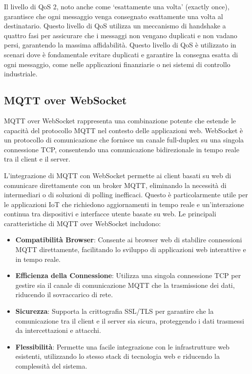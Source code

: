 \documentclass[12pt,a4paper,openright,twoside]{book}
\begin{document}
Il livello di \ac{QoS} 2, noto anche come `esattamente una volta' (exactly once), garantisce che ogni messaggio venga consegnato esattamente una volta al destinatario. 
Questo livello di \ac{QoS} utilizza un meccanismo di handshake a quattro fasi per assicurare che i messaggi non vengano duplicati e non vadano persi, garantendo la massima 
affidabilità. Questo livello di \ac{QoS} è utilizzato in scenari dove è fondamentale evitare duplicati e garantire la consegna esatta di ogni messaggio, come nelle applicazioni 
finanziarie o nei sistemi di controllo industriale.

\subsection{MQTT over WebSocket}

\ac{MQTT} over WebSocket rappresenta una combinazione potente che estende le capacità del protocollo \ac{MQTT} nel contesto delle applicazioni web. WebSocket è un protocollo 
di comunicazione che fornisce un canale full-duplex su una singola connessione \ac{TCP}, consentendo una comunicazione bidirezionale in tempo reale tra il client e il server.

L'integrazione di \ac{MQTT} con WebSocket permette ai client basati su web di comunicare direttamente con un broker \ac{MQTT}, eliminando la necessità di intermediari o di 
soluzioni di polling inefficaci. Questo è particolarmente utile per le applicazioni \ac{IoT} che richiedono aggiornamenti in tempo reale e un'interazione continua tra 
dispositivi e interfacce utente basate su web. Le principali caratteristiche di \ac{MQTT} over WebSocket includono:

\begin{itemize}
    \item \textbf{Compatibilità Browser}: 
    Consente ai browser web di stabilire connessioni \ac{MQTT} direttamente, facilitando lo sviluppo di applicazioni web interattive e in tempo reale.
    \item \textbf{Efficienza della Connessione}: 
    Utilizza una singola connessione \ac{TCP} per gestire sia il canale di comunicazione \ac{MQTT} che la trasmissione dei dati, riducendo il sovraccarico di rete.
    \item \textbf{Sicurezza}: 
    Supporta la crittografia SSL/TLS per garantire che la comunicazione tra il client e il server sia sicura, proteggendo i dati trasmessi da intercettazioni e attacchi.
    \item \textbf{Flessibilità}: 
    Permette una facile integrazione con le infrastrutture web esistenti, utilizzando lo stesso stack di tecnologia web e riducendo la complessità del sistema.
\end{itemize}
\end{document}
